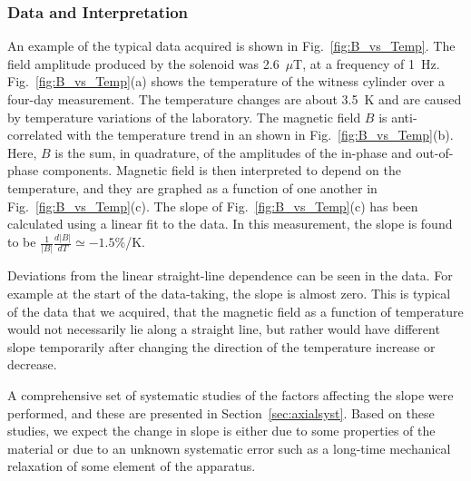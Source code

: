 



\subsubsection{Data and Interpretation}

An example of the typical data acquired is shown in
Fig.~\ref{fig:B_vs_Temp}.  The field amplitude produced by the
solenoid was 2.6~$\mu$T, at a frequency of 1~Hz.
Fig.~\ref{fig:B_vs_Temp}(a) shows the temperature of the witness
cylinder over a four-day measurement.  The temperature changes are
about 3.5~K and are caused by temperature variations of the
laboratory.
%
%
The magnetic field $B$ is anti-correlated with the temperature trend
in an shown in Fig.~\ref{fig:B_vs_Temp}(b).  Here, $B$ is the sum, in
quadrature, of the amplitudes of the in-phase and out-of-phase
components.  Magnetic field is then interpreted to depend on the
temperature, and they are graphed as a function of one another in
Fig.~\ref{fig:B_vs_Temp}(c).  The slope of Fig.~\ref{fig:B_vs_Temp}(c)
has been calculated using a linear fit to the data.  In this
measurement, the slope is found to be
$\frac{1}{|B|}\frac{d|B|}{dT}\simeq -1.5\%$/K.

Deviations from the linear straight-line dependence can be seen in the
data.  For example at the start of the data-taking, the slope is
almost zero.  This is typical of the data that we acquired, that the
magnetic field as a function of temperature would not necessarily lie
along a straight line, but rather would have different slope
temporarily after changing the direction of the temperature increase
or decrease.

A comprehensive set of systematic studies of the factors affecting the
slope were performed, and these are presented in
Section~\ref{sec:axialsyst}.  Based on these studies, we expect the
change in slope is either due to some properties of the material or
due to an unknown systematic error such as a long-time mechanical
relaxation of some element of the apparatus.

